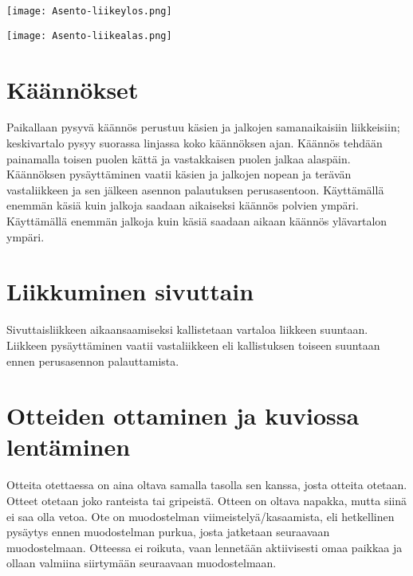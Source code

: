 \begin{Figure}\centering\texttt{[image: Asento-liikeylos.png]}\end{Figure} \begin{Figure}\centering\texttt{[image: Asento-liikealas.png]}\end{Figure} 

\section{ Käännökset }
\label{fs-kuviohyppaaminen-kaannokset}


Paikallaan pysyvä käännös perustuu käsien ja jalkojen samanaikaisiin liikkeisiin; keskivartalo pysyy suorassa linjassa koko käännöksen ajan. Käännös tehdään painamalla toisen puolen kättä ja vastakkaisen puolen jalkaa alaspäin. Käännöksen pysäyttäminen vaatii käsien ja jalkojen nopean ja terävän vastaliikkeen ja sen jälkeen asennon palautuksen perusasentoon. Käyttämällä enemmän käsiä kuin jalkoja saadaan aikaiseksi käännös polvien ympäri. Käyttämällä enemmän jalkoja kuin käsiä saadaan aikaan käännös ylävartalon ympäri. 

\section{ Liikkuminen sivuttain }
\label{fs-kuviohyppaaminen-liikkuminen-sivuttain}


Sivuttaisliikkeen aikaansaamiseksi kallistetaan vartaloa liikkeen suuntaan. Liikkeen pysäyttäminen vaatii vastaliikkeen eli kallistuksen toiseen suuntaan ennen perusasennon palauttamista. 

\section{ Otteiden ottaminen ja kuviossa lentäminen }
\label{fs-kuviohyppaaminen-otteiden-ottaminen-ja-kuviossa-lentaminen}


Otteita otettaessa on aina oltava samalla tasolla sen kanssa, josta otteita otetaan. Otteet otetaan joko ranteista tai gripeistä. Otteen on oltava napakka, mutta siinä ei saa olla vetoa. Ote on muodostelman viimeistelyä/kasaamista, eli hetkellinen pysäytys ennen muodostelman purkua, josta jatketaan seuraavaan muodostelmaan. Otteessa ei roikuta, vaan lennetään aktiivisesti omaa paikkaa ja ollaan valmiina siirtymään seuraavaan muodostelmaan. 

